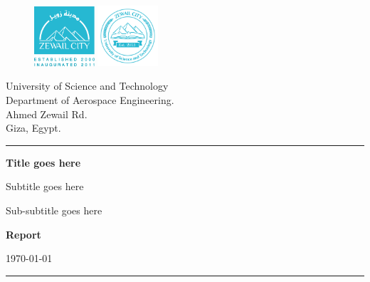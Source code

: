 
\begin{titlepage}

\begin{figure}[htbp]
    \centering
    \includegraphics[width=0.2\textwidth]{Fig/logo city.pdf}
    \hfill
    \includegraphics[width=0.2\textwidth]{Fig/logo UST.pdf}
\end{figure}


\vspace{-0.5cm}
\begin{flushright}
    {\small University of Science and Technology}\\
    {\small Department of Aerospace Engineering.}\\
    {\small Ahmed Zewail Rd.}\\
    {\small Giza, Egypt.}
\end{flushright}
\hrule
\vspace{1cm}


{\LARGE\noindent \textbf{Title goes here} \par}
\vspace{0.3cm}
{\Large\noindent Subtitle goes here \par}
\vspace{0.1cm}
{\small\noindent Sub-subtitle goes here \par}
\vspace{2cm}
{\Large\noindent \textbf{Report} \par}
\vspace{0.3cm}
{\Large\noindent \today \par}
\vspace{7cm}
\hrule



\end{titlepage}
